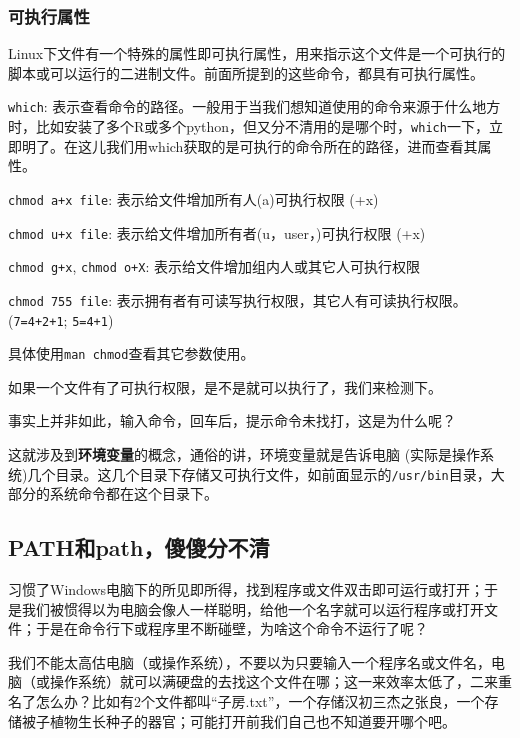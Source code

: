 \documentclass[]{article}
\numberwithin{figure}{section}
\numberwithin{table}{section}
\begin{document}
\hypertarget{executable}{%
\subsubsection{可执行属性}\label{executable}}

Linux下文件有一个特殊的属性即可执行属性，用来指示这个文件是一个可执行的脚本或可以运行的二进制文件。前面所提到的这些命令，都具有可执行属性。

\texttt{which}: 表示查看命令的路径。一般用于当我们想知道使用的命令来源于什么地方时，比如安装了多个R或多个python，但又分不清用的是哪个时，\texttt{which}一下，立即明了。在这儿我们用which获取的是可执行的命令所在的路径，进而查看其属性。

\texttt{chmod\ a+x\ file}: 表示给文件增加所有人(a)可执行权限 (+x)

\texttt{chmod\ u+x\ file}: 表示给文件增加所有者(u，user，)可执行权限 (+x)

\texttt{chmod\ g+x}, \texttt{chmod\ o+X}: 表示给文件增加组内人或其它人可执行权限

\texttt{chmod\ 755\ file}: 表示拥有者有可读写执行权限，其它人有可读执行权限。(\texttt{7=4+2+1}; \texttt{5=4+1})

具体使用\texttt{man\ chmod}查看其它参数使用。

如果一个文件有了可执行权限，是不是就可以执行了，我们来检测下。

事实上并非如此，输入命令，回车后，提示命令未找打，这是为什么呢？

这就涉及到\textbf{环境变量}的概念，通俗的讲，环境变量就是告诉电脑 (实际是操作系统)几个目录。这几个目录下存储又可执行文件，如前面显示的\texttt{/usr/bin}目录，大部分的系统命令都在这个目录下。

\hypertarget{PATH_path_which}{%
\subsection{PATH和path，傻傻分不清}\label{PATH_path_which}}

习惯了Windows电脑下的所见即所得，找到程序或文件双击即可运行或打开；于是我们被惯得以为电脑会像人一样聪明，给他一个名字就可以运行程序或打开文件；于是在命令行下或程序里不断碰壁，为啥这个命令不运行了呢？

我们不能太高估电脑（或操作系统），不要以为只要输入一个程序名或文件名，电脑（或操作系统）就可以满硬盘的去找这个文件在哪；这一来效率太低了，二来重名了怎么办？比如有2个文件都叫``子房.txt''，一个存储汉初三杰之张良，一个存储被子植物生长种子的器官；可能打开前我们自己也不知道要开哪个吧。
\end{document}
